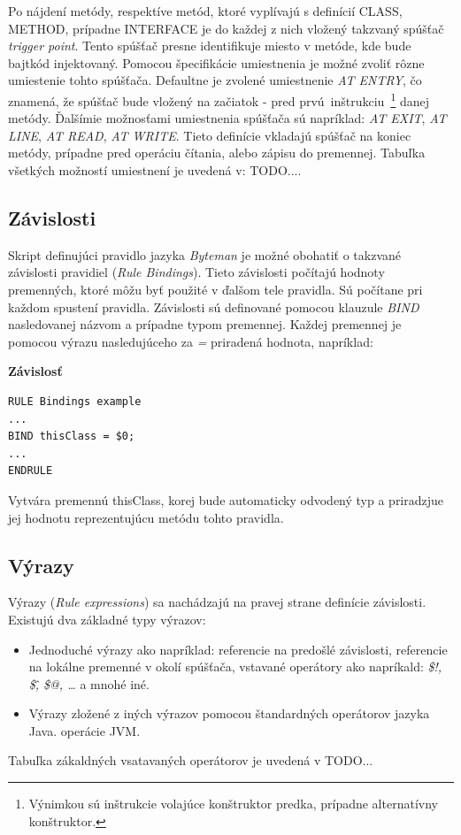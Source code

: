 \documentclass[11pt,final,oneside]{fithesis}
\newenvironment{example}[1]
{
\vspace{3mm}
\noindent\textbf{#1}
\vspace{2mm}
}
{
\vspace{3mm}
}
\begin{document}
Po nájdení metódy, respektíve metód, ktoré vyplívajú s definícií CLASS, METHOD, prípadne INTERFACE je do každej z nich vložený takzvaný spúšťač \textit{trigger point}. Tento spúšťač presne identifikuje miesto v metóde, kde bude bajtkód injektovaný. Pomocou špecifikácie umiestnenia je možné zvoliť rôzne umiestenie tohto spúšťača. Defaultne je zvolené umiestnenie \textit{AT ENTRY}, čo znamená, že spúšťač bude vložený na začiatok - pred prvú~inštrukciu~\footnote{Výnimkou sú inštrukcie volajúce konštruktor predka, prípadne alternatívny konštruktor.} danej metódy. Ďalšímie možnosťami umiestnenia spúšťača sú napríklad: \textit{AT EXIT}, \textit{AT LINE}, \textit{AT READ}, \textit{AT WRITE}. Tieto definície vkladajú spúšťač na koniec metódy, prípadne pred operáciu čítania, alebo zápisu do premennej. Tabuľka všetkých možností umiestnení je uvedená v: TODO....

\subsection{Závislosti}
Skript definujúci  pravidlo jazyka \textit{Byteman} je možné obohatiť o takzvané závislosti pravidiel (\textit{Rule Bindings}). Tieto závislosti počítajú hodnoty premenných, ktoré môžu byť použité v ďalšom tele pravidla. Sú počítane pri každom spustení pravidla. Závislosti sú definované pomocou klauzule \textit{BIND} nasledovanej názvom a prípadne typom premennej. Každej premennej je pomocou výrazu nasledujúceho za \textit{=} priradená hodnota, napríklad:

\begin{example}{Závislosť}
\begin{verbatim}
RULE Bindings example
...
BIND thisClass = $0;
...
ENDRULE
\end{verbatim}
\end{example}

Vytvára premennú thisClass, korej bude automaticky odvodený typ a priradzjue jej hodnotu reprezentujúcu metódu tohto pravidla.

\subsection{Výrazy}
Výrazy (\textit{Rule expressions}) sa nachádzajú na pravej strane definície závislosti. Existujú dva základné typy výrazov:
\begin{itemize}
\item Jednoduché výrazy ako napríklad: referencie na predošlé závislosti, referencie na lokálne premenné v okolí spúšťača, vstavané operátory ako napríkald: \textit{\$!, \$\^, \$@, …} a mnohé iné.
\item Výrazy zložené z iných výrazov pomocou štandardných operátorov jazyka Java.
operácie JVM.
\end{itemize}
Tabuľka zákaldných vsatavaných operátorov je uvedená v TODO...
\end{document}
